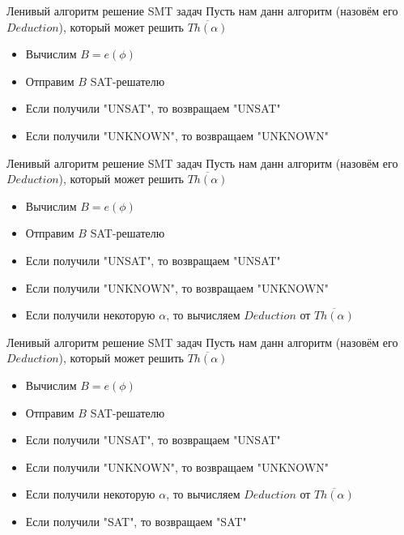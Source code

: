 \documentclass{beamer}
\begin{document}
\begin{frame}{Ленивый алгоритм решение SMT задач}
Пусть нам данн алгоритм (назовём его $Deduction$), который может решить $\overline{Th(\alpha)}$
\begin{itemize}
\item Вычислим $B = e(\phi)$
\item Отправим $B$ SAT-решателю
\item Если получили "UNSAT", то возвращаем "UNSAT"
\item Если получили "UNKNOWN", то возвращаем "UNKNOWN"
\end{itemize}
\end{frame}

\begin{frame}{Ленивый алгоритм решение SMT задач}
Пусть нам данн алгоритм (назовём его $Deduction$), который может решить $\overline{Th(\alpha)}$
\begin{itemize}
\item Вычислим $B = e(\phi)$
\item Отправим $B$ SAT-решателю
\item Если получили "UNSAT", то возвращаем "UNSAT"
\item Если получили "UNKNOWN", то возвращаем "UNKNOWN"
\item Если получили некоторую $\alpha$, то вычисляем $Deduction$ от $\overline{Th(\alpha)}$
\end{itemize}
\end{frame}

\begin{frame}{Ленивый алгоритм решение SMT задач}
Пусть нам данн алгоритм (назовём его $Deduction$), который может решить $\overline{Th(\alpha)}$
\begin{itemize}
\item Вычислим $B = e(\phi)$
\item Отправим $B$ SAT-решателю
\item Если получили "UNSAT", то возвращаем "UNSAT"
\item Если получили "UNKNOWN", то возвращаем "UNKNOWN"
\item Если получили некоторую $\alpha$, то вычисляем $Deduction$ от $\overline{Th(\alpha)}$
\item Если получили "SAT", то возвращаем "SAT"
\end{itemize}
\end{frame}
\end{document}
